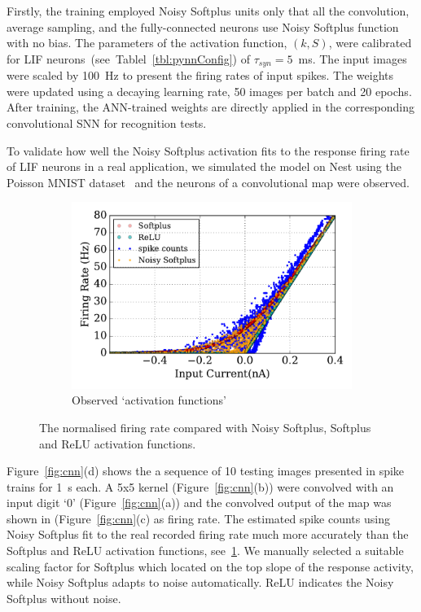 	Firstly, the training employed Noisy Softplus units only that all the convolution, average sampling, and the fully-connected neurons use Noisy Softplus function with no bias.
	The parameters of the activation function, $(k, S)$, were calibrated for LIF neurons~(see~Tablel~\ref{tbl:pynnConfig}) of $\tau_{syn}=5$~ms.
	The input images were scaled by 100~Hz to present the firing rates of input spikes.
	The weights were updated using a decaying learning rate, 50 images per batch and 20 epochs.
	After training, the ANN-trained weights are directly applied in the corresponding convolutional SNN for recognition tests.
	
	To validate how well the Noisy Softplus activation fits to the response firing rate of LIF neurons in a real application, we simulated the model on Nest using the Poisson MNIST dataset~\cite{liu2016bench} and the neurons of a convolutional map were observed.
	

		
		\begin{figure}[tbh!]
			\centering
			\begin{subfigure}[t]{0.7\textwidth}
				\includegraphics[width=\textwidth]{pics_iconip/6-5.pdf}
				\caption{Observed `activation functions'}
			\end{subfigure}
			\caption{The normalised firing rate compared with Noisy Softplus, Softplus and ReLU activation functions.}
			\label{fig:af_compare}
		\end{figure}

	Figure~\ref{fig:cnn}(d) shows the a sequence of 10 testing images presented in spike trains for 1~s each.  A 5x5 kernel (Figure~\ref{fig:cnn}(b)) were convolved with an input digit `0' (Figure~\ref{fig:cnn}(a)) and the convolved output of the map was shown in (Figure~\ref{fig:cnn}(c) as firing rate.
	The estimated spike counts using Noisy Softplus fit to the real recorded firing rate much more accurately than the Softplus and ReLU activation functions, see~\ref{fig:af_compare}.
	We manually selected a suitable scaling factor for Softplus which located on the top slope of the response activity, while Noisy Softplus adapts to noise automatically.
	ReLU indicates the Noisy Softplus without noise.
	
